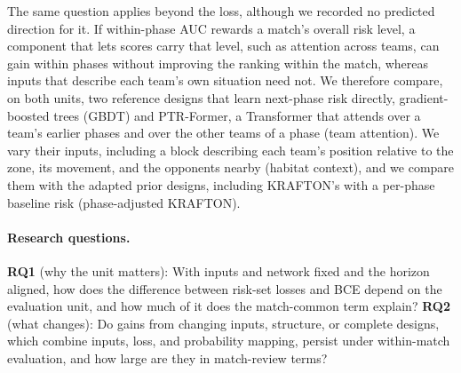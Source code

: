 \documentclass[sigconf,anonymous]{acmart}
\begin{document}
The same question applies beyond the loss, although we recorded no predicted direction for it. If within-phase AUC rewards a match's overall risk level, a component that lets scores carry that level, such as attention across teams, can gain within phases without improving the ranking within the match, whereas inputs that describe each team's own situation need not. We therefore compare, on both units, two reference designs that learn next-phase risk directly, gradient-boosted trees (GBDT) and PTR-Former, a Transformer that attends over a team's earlier phases and over the other teams of a phase (team attention). We vary their inputs, including a block describing each team's position relative to the zone, its movement, and the opponents nearby (habitat context), and we compare them with the adapted prior designs, including KRAFTON's with a per-phase baseline risk (phase-adjusted KRAFTON).

\paragraph{Research questions.}
\textbf{RQ1} (why the unit matters): With inputs and network fixed and the horizon aligned, how does the difference between risk-set losses and BCE depend on the evaluation unit, and how much of it does the match-common term explain?
\textbf{RQ2} (what changes): Do gains from changing inputs, structure, or complete designs, which combine inputs, loss, and probability mapping, persist under within-match evaluation, and how large are they in match-review terms?
\end{document}
